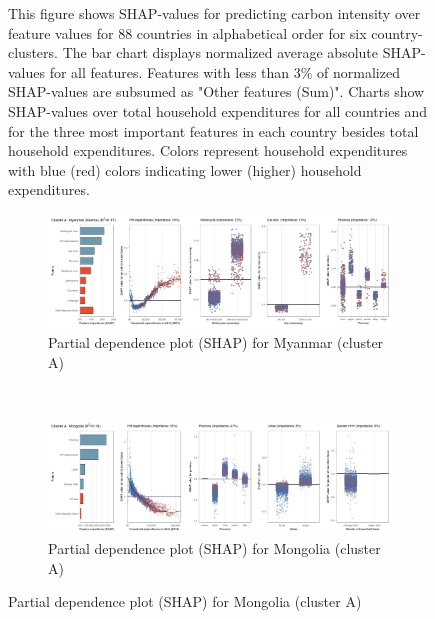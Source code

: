 \begin{figure}[ht!]
    \begin{subcaption2}
     This figure shows SHAP-values for predicting carbon intensity over feature values for 88 countries in alphabetical order for six country-clusters. The bar chart displays normalized average absolute SHAP-values for all features. Features with less than 3\% of normalized SHAP-values are subsumed as "Other features (Sum)". Charts show SHAP-values over total household expenditures for all countries and for the three most important features in each country besides total household expenditures. Colors represent household expenditures with blue (red) colors indicating lower (higher) household expenditures.
     \end{subcaption2}
\end{figure}

\begin{figure}[ht!]\ContinuedFloat
    \centering
   \begin{subfigure}[b]{\textwidth}
   \centering
         \caption{Partial dependence plot (SHAP) for Myanmar (cluster A)}
         \label{fig:5b_MMR}
         \includegraphics[width=\textwidth]{Figure 5b/Figure_5b_MMR}     
         \end{subfigure}
    \\
    \vspace{0.5cm}
    \begin{subfigure}[b]{\textwidth}
   \centering
         \caption{Partial dependence plot (SHAP) for Mongolia (cluster A)}
         \label{fig:5b_MNG}
         \includegraphics[width=\textwidth]{Figure 5b/Figure_5b_MNG}
         \end{subfigure}

\end{figure}
